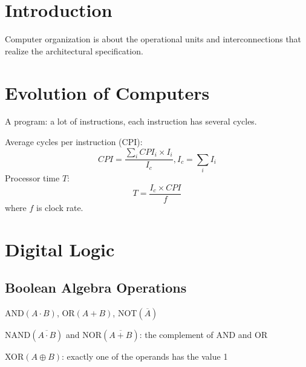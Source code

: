 \documentclass[11pt,a4paper]{article}
\begin{document}
\makenotestitle

\tableofcontents
\newpage
{}

\section{Introduction}
Computer organization is about the operational units and interconnections that realize the architectural specification. \par

\section{Evolution of Computers}
A program: a lot of instructions, each instruction has several cycles. \par
Average cycles per instruction (CPI):
\[
CPI = \frac{\sum_i CPI_i \times I_i}{I_c}, I_c = \sum_i I_i
\]
Processor time $T$:
\[
T = \frac{I_c \times CPI}{f}
\]
where $f$ is clock rate.

\section{Digital Logic}
\subsection{Boolean Algebra Operations}
AND$(A \cdot B)$, OR$(A + B)$, NOT$(\overline{A})$ \par
NAND$(\overline{A \cdot B})$ and NOR$(\overline{A + B})$: the complement of AND and OR \par
XOR$(A \oplus B)$: exactly one of the operands has the value 1 \par
\end{document}
